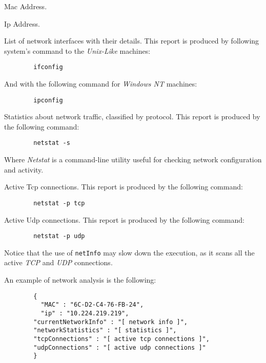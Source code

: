 \begin{description}
  \setlength\itemsep{1em}
  \item [Mac] Mac Address.
  \item [Ip] Ip Address.
  \item [CurrentNetworkInfo] List of network interfaces with their details. This report is produced by following system's command to the \textit{Unix-Like} machines:
	\begin{verbatim}
		ifconfig
	\end{verbatim}
	And with the following command for \textit{Windows NT} machines: 
	\begin{verbatim}
		ipconfig
	\end{verbatim}
  \item [NetworkStatistics] Statistics about network traffic, classified by protocol. This report is produced by the following command: 
	\begin{verbatim}
		netstat -s			
	\end{verbatim}
	Where \textit{Netstat} is a command-line utility useful  for checking network configuration and activity.
  \item [TcpConnections] Active Tcp connections. This report is produced by the following command: 
  	\begin{verbatim}
		netstat -p tcp  		
  	\end{verbatim}
  \item [UdpConnections] Active Udp connections. This report is produced by the following command: 
  	\begin{verbatim}
		netstat -p udp  		
  	\end{verbatim}

 \end{description}

Notice that the use of \texttt{netInfo} may slow down the execution, as it scans all the active \textit{TCP} and \textit{UDP} connections.

An example of network analysis is the following:

\begin{description}
	\item 
		\begin{verbatim}
		{
		  "MAC" : "6C-D2-C4-76-FB-24",
		  "ip" : "10.224.219.219",
	 	"currentNetworkInfo" : "[ network info ]",
	 	"networkStatistics" : "[ statistics ]",
	 	"tcpConnections" : "[ active tcp connections ]",
	 	"udpConnections" : "[ active udp connections ]"
		}
	\end{verbatim}
\end{description}